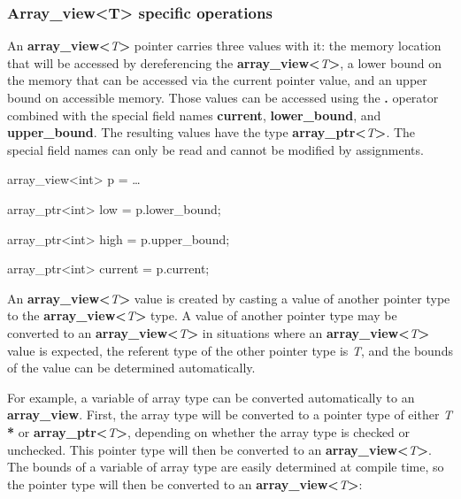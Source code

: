 \documentclass[]{article}
\begin{document}
\subsubsection{\texorpdfstring{\protect\hypertarget{ux5fToc426641063}{}{\protect\hypertarget{ux5fToc435434923}{}{\protect\hypertarget{ux5fToc437460744}{}{\protect\hypertarget{ux5fToc440445416}{}{\protect\hypertarget{ux5fToc440449198}{}{\protect\hypertarget{ux5fToc440551848}{}{}}}}}}Array\_view\textless{}T\textgreater{}
specific
operations}{Array\_view\textless{}T\textgreater{} specific operations}}\label{arrayux5fviewt-specific-operations}

An \textbf{array\_view\textless{}}\emph{T}\textbf{\textgreater{}}
pointer carries three values with it: the memory location that will be
accessed by dereferencing the
\textbf{array\_view\textless{}}\emph{T}\textbf{\textgreater{}}, a lower
bound on the memory that can be accessed via the current pointer value,
and an upper bound on accessible memory. Those values can be accessed
using the \textbf{.} operator combined with the special field names
\textbf{current}, \textbf{lower\_bound}, and \textbf{upper\_bound}. The
resulting values have the type
\textbf{array\_ptr\textless{}}\emph{T}\textbf{\textgreater{}}. The
special field names can only be read and cannot be modified by
assignments.

array\_view\textless{}int\textgreater{} p = \ldots{}

array\_ptr\textless{}int\textgreater{} low = p.lower\_bound;

array\_ptr\textless{}int\textgreater{} high = p.upper\_bound;

array\_ptr\textless{}int\textgreater{} current = p.current;

An \textbf{array\_view\textless{}}\emph{T}\textbf{\textgreater{}} value
is created by casting a value of another pointer type to the
\textbf{array\_view\textless{}}\emph{T}\textbf{\textgreater{}} type. A
value of another pointer type may be converted to an
\textbf{array\_view\textless{}}\emph{T}\textbf{\textgreater{}} in
situations where an
\textbf{array\_view\textless{}}\emph{T}\textbf{\textgreater{}} value is
expected, the referent type of the other pointer type is \emph{T}, and
the bounds of the value can be determined automatically.

For example, a variable of array type can be converted automatically to
an \textbf{array\_view}. First, the array type will be converted to a
pointer type of either \emph{T} \textbf{*} or
\textbf{array\_ptr\textless{}}\emph{T}\textbf{\textgreater{}}, depending
on whether the array type is checked or unchecked. This pointer type
will then be converted to an
\textbf{array\_view\textless{}}\emph{T}\textbf{\textgreater{}}. The
bounds of a variable of array type are easily determined at compile
time, so the pointer type will then be converted to an
\textbf{array\_view\textless{}}\emph{T}\textbf{\textgreater{}}:
\end{document}

